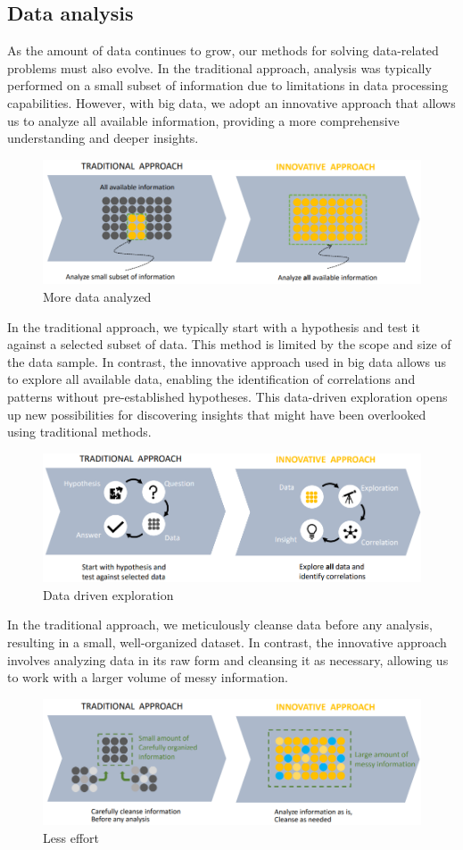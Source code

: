 \subsection{Data analysis}
As the amount of data continues to grow, our methods for solving data-related problems must also evolve. 
In the traditional approach, analysis was typically performed on a small subset of information due to limitations in data processing capabilities. 
However, with big data, we adopt an innovative approach that allows us to analyze all available information, providing a more comprehensive understanding and deeper insights.
\begin{figure}[H]
    \centering
    \includegraphics[width=0.75\linewidth]{images/in.png}
    \caption{More data analyzed}
\end{figure}
In the traditional approach, we typically start with a hypothesis and test it against a selected subset of data. 
This method is limited by the scope and size of the data sample.
In contrast, the innovative approach used in big data allows us to explore all available data, enabling the identification of correlations and patterns without pre-established hypotheses.
This data-driven exploration opens up new possibilities for discovering insights that might have been overlooked using traditional methods.
\begin{figure}[H]
    \centering
    \includegraphics[width=0.75\linewidth]{images/in1.png}
    \caption{Data driven exploration}
\end{figure}
In the traditional approach, we meticulously cleanse data before any analysis, resulting in a small, well-organized dataset. 
In contrast, the innovative approach involves analyzing data in its raw form and cleansing it as necessary, allowing us to work with a larger volume of messy information.
\begin{figure}[H]
    \centering
    \includegraphics[width=0.75\linewidth]{images/in2.png}
    \caption{Less effort}
\end{figure}
